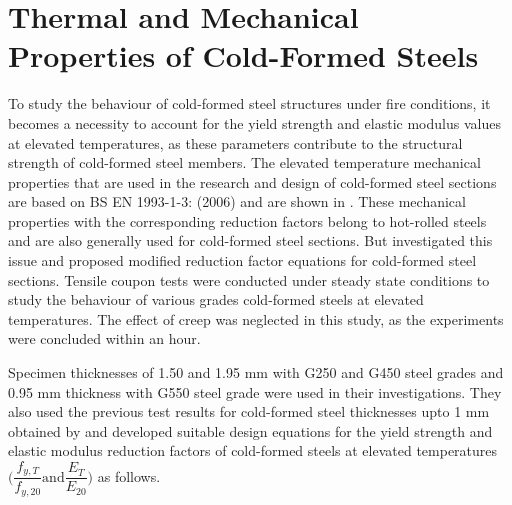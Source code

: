 \section{Thermal and Mechanical Properties of Cold-Formed Steels}

To study the behaviour of cold-formed steel structures under fire conditions, it becomes a necessity to account for the yield strength and elastic modulus values at elevated temperatures, as these parameters contribute to the structural strength of cold-formed steel members. The elevated temperature mechanical properties that are used in the research and design of cold-formed steel sections are based on BS EN 1993-1-3: (2006) and are shown in . These mechanical properties with the corresponding reduction factors belong to hot-rolled steels and are also generally used for cold-formed steel sections. But \citet{Kankanamge2011} investigated this issue and proposed modified reduction factor equations for cold-formed steel sections. Tensile coupon tests were conducted under steady state conditions to study the behaviour of various grades cold-formed steels at elevated temperatures. The effect of creep was neglected in this study, as the experiments were concluded within an hour.

Specimen thicknesses of 1.50 and 1.95 mm with G250 and G450 steel grades and 0.95 mm thickness with G550 steel grade were used in their investigations. They also used the previous test results for cold-formed steel thicknesses upto 1 mm obtained by \citet{Ranawaka2009a} and developed suitable design equations for the yield strength and elastic modulus reduction factors of cold-formed steels at elevated temperatures $\Big(\dfrac{f_{y,T}}{f_{y,20}} \text{and} \dfrac{E_T}{E_{20}} \Big)$ as follows.

